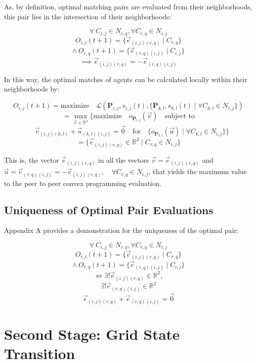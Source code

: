 \documentclass[12pt]{article}
\begin{document}
  As, by definition, optimal matching pairs are evaluated from their neighborhoods, this pair lies in the intersection of their neighborhoods:
  
    \[
  \forall \ C_{i, j} \in N_{r,q}, \forall C_{r,q} \in N_{i,j} 
  \]
  \[
  O_{i,j}(t+1) = \{\vec{e}_{(i,j) (r,q)} \mid C_{r,q}\}
  \]
  \[
  \land \ O_{r,q}(t+1) = \{\vec{e}_{(r,q) (i,j)} \mid C_{i,j}\}
  \]
  \[
    \implies \vec{e}_{(i,j) (r,q)} = - \vec{e}_{(r,q) (i,j)} \tag{3.2.4}
  \]
  
  In this way, the optimal matches of agents can be calculated locally within their neighborhoods by:
  
    \[
  O_{i,j}(t+1) = \text{maximize} \quad \mathcal{L}\left(\mathbf{P}_{i,j},s_{i,j}(t), \{\mathbf{P}_{k,l},s_{k,l}(t) \mid \forall C_{k,l} \in N_{i,j}\}\right)
  \]
  \[
  = \max_{\vec{v} \in \mathbb{R}^{2}} \{ \text{maximize} \quad o_{\mathbf{P}_{i,j}}(\vec{v}) \quad  \text{subject to}
  \]
  \[
  \quad \vec{v}_{(i,j)(k,l)} + \vec{u}_{(k,l)(i,j)} = \vec{0}  \quad \text{for} \quad \{o_{\mathbf{P}_{k,l}}(\vec{u}) \mid \forall C_{k,l} \in N_{i,j}\} \}
  \]
  \[
  = \{\vec{e}_{(i,j) (r,q)} \in \mathbb{R}^{2} \mid C_{r,q} \in N_{i,j}\} \tag{3.2.5}
  \]
  
  This is, the vector \(\vec{e}_{(i,j) (r,q)}\) in all the vectors \(\vec{v} = \vec{e}_{(i,j) (r,q)}\) and \(\vec{u} = \vec{e}_{(r,q) (i,j)} = -\vec{e}_{(i,j) (r,q)}  ,\quad \forall C_{r,q} \in N_{i,j} \), that yields the maximum value to the peer to peer convex programming evaluation.

\subsection{Uniqueness of Optimal Pair Evaluations}

Appendix A provides a demonstration for the uniqueness of the optimal pair:

    \[
  \forall \ C_{i, j} \in N_{r,q}, \forall C_{r,q} \in N_{i,j} 
  \]
  \[
  O_{i,j}(t+1) = \{\vec{e}_{(i,j) (r,q)} \mid C_{r,q}\}
  \]
  \[
  \land \ O_{r,q}(t+1) = \{\vec{e}_{(r,q) (i,j)} \mid C_{i,j}\}
  \]
  \[
    \iff \exists! \vec{e}_{(i,j) (r,q)} \in \mathbb{R}^2, 
  \]
  \[
  \exists! \vec{e}_{(r,q) (i,j)} \in \mathbb{R}^2
  \]
  \[
    \vec{e}_{(i,j) (r,q)} + \vec{e}_{(r,q) (i,j)} = \vec{0} \tag{3.3.1}
  \]
  

\section{Second Stage: Grid State Transition}
\end{document}

